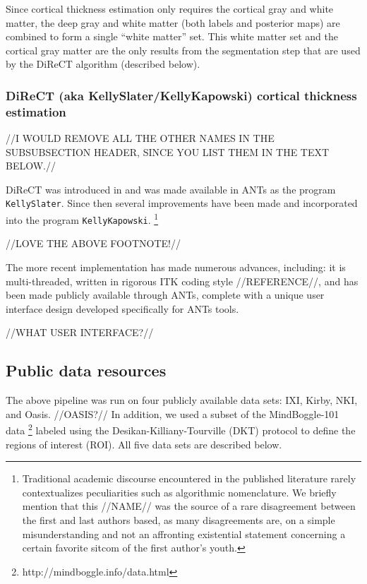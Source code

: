 Since cortical thickness estimation only requires the cortical gray
and white matter, the deep gray and white matter
(both labels and posterior maps) are combined to form a single
``white matter'' set.  This white matter set and the cortical
gray matter are the only results from the segmentation
step that are used by the DiReCT algorithm (described below).


\subsubsection{DiReCT (aka KellySlater/KellyKapowski) cortical thickness estimation}

//I WOULD REMOVE ALL THE OTHER NAMES IN THE SUBSUBSECTION HEADER, SINCE YOU LIST THEM IN THE TEXT BELOW.//

DiReCT was introduced 
in \cite{das2009} and was made available in ANTs as the program \verb#KellySlater#.
Since then several improvements have been made and incorporated into the program
\verb#KellyKapowski#.%
\footnote{
Traditional academic discourse encountered in the published literature
rarely contextualizes peculiarities such as algorithmic nomenclature.
We briefly mention that
this //NAME// was the source of a rare disagreement between the first and last authors
based, as many disagreements are, on a simple misunderstanding and not an
affronting existential statement concerning a certain favorite sitcom
of the first author's youth. 
}

//LOVE THE ABOVE FOOTNOTE!//

The more recent implementation has made numerous advances, including:
it is multi-threaded, written in rigorous ITK coding style //REFERENCE//, and
has been made publicly available through ANTs, complete with a unique user
interface design developed specifically for ANTs tools.

//WHAT USER INTERFACE?//

\subsection{Public data resources}

The above pipeline was run on four publicly available data sets:
IXI, Kirby, NKI, and Oasis.  //OASIS?//
In addition, we used a subset of the MindBoggle-101 data%
\footnote{
http://mindboggle.info/data.html
} 
labeled using the 
Desikan-Killiany-Tourville (DKT) protocol \citep{klein2012} to define the
regions of interest (ROI).
All five data sets are described below.

